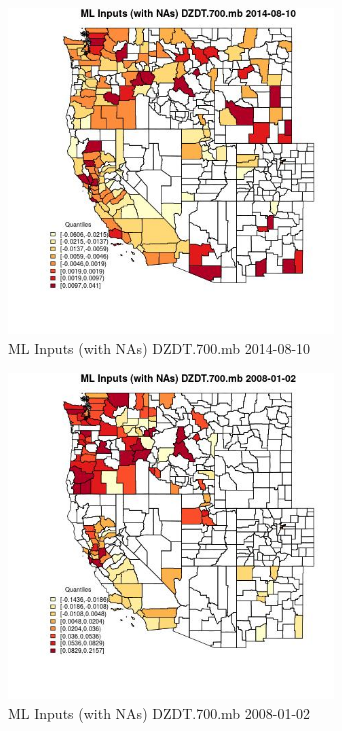 \begin{figure} 
\centering  
\includegraphics[width=0.77\textwidth]{Code_Outputs/Report_ML_input_PM25_Step4_part_e_de_duplicated_aves_compiled_2019-05-18wNAs_CountyDZDT700mbMean2014-08-10_2014-08-10.jpg} 
\caption{\label{fig:Report_ML_input_PM25_Step4_part_e_de_duplicated_aves_compiled_2019-05-18wNAsCountyDZDT700mbMean2014-08-10_2014-08-10}ML Inputs (with NAs) DZDT.700.mb 2014-08-10} 
\end{figure} 
 

\begin{figure} 
\centering  
\includegraphics[width=0.77\textwidth]{Code_Outputs/Report_ML_input_PM25_Step4_part_e_de_duplicated_aves_compiled_2019-05-18wNAs_CountyDZDT700mbMean2008-01-02_2008-01-02.jpg} 
\caption{\label{fig:Report_ML_input_PM25_Step4_part_e_de_duplicated_aves_compiled_2019-05-18wNAsCountyDZDT700mbMean2008-01-02_2008-01-02}ML Inputs (with NAs) DZDT.700.mb 2008-01-02} 
\end{figure} 
 

